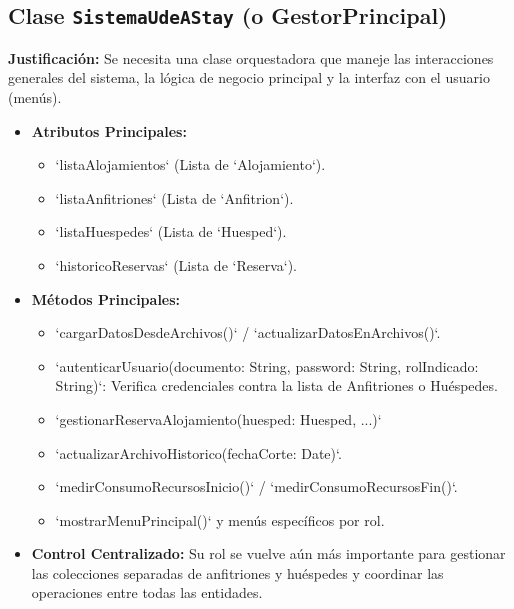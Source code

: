 \documentclass[journal]{IEEEtran}
\begin{document}
\subsection{Clase \texttt{SistemaUdeAStay} (o GestorPrincipal)}
\textbf{Justificación:} Se necesita una clase orquestadora que maneje las interacciones generales del sistema, la lógica de negocio principal y la interfaz con el usuario (menús).
\begin{itemize}
    \item \textbf{Atributos Principales:}
        \begin{itemize}
            \item `listaAlojamientos` (Lista de `Alojamiento`).
            \item `listaAnfitriones` (Lista de `Anfitrion`).
            \item `listaHuespedes` (Lista de `Huesped`).
            \item `historicoReservas` (Lista de `Reserva`).
        \end{itemize}
    \item \textbf{Métodos Principales:}
        \begin{itemize}
            \item `cargarDatosDesdeArchivos()` / `actualizarDatosEnArchivos()`.
            \item `autenticarUsuario(documento: String, password: String, rolIndicado: String)`: Verifica credenciales contra la lista de Anfitriones o Huéspedes.
            \item `gestionarReservaAlojamiento(huesped: Huesped, ...)`
            \item `actualizarArchivoHistorico(fechaCorte: Date)`.
            \item `medirConsumoRecursosInicio()` / `medirConsumoRecursosFin()`.
            \item `mostrarMenuPrincipal()` y menús específicos por rol.
        \end{itemize}
    \item \textbf{Control Centralizado:} Su rol se vuelve aún más importante para gestionar las colecciones separadas de anfitriones y huéspedes y coordinar las operaciones entre todas las entidades.
\end{itemize}
\end{document}
